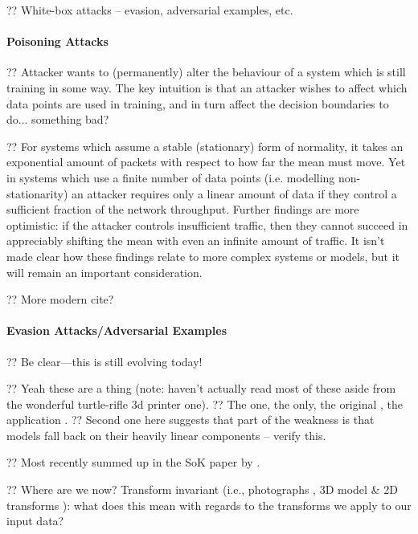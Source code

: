 ?? White-box attacks -- evasion, adversarial examples, etc.

\paragraph{Poisoning Attacks}
?? Attacker wants to (permanently) alter the behaviour of a system which is still training in some way.
The key intuition is that an attacker wishes to affect which data points are used in training, and in turn affect the decision boundaries to do... something bad?

?? For systems which assume a stable (stationary) form of normality, it takes an exponential amount of packets with respect to how far the mean must move.
Yet in systems which use a finite number of data points (i.e. modelling non-stationarity) an attacker requires only a linear amount of data if they control a sufficient fraction of the network throughput.
Further findings are more optimistic: if the attacker controls insufficient traffic, then they cannot succeed in appreciably shifting the mean with even an infinite amount of traffic.
It isn't made clear how these findings relate to more complex systems or models, but it will remain an important consideration. \cite{DBLP:journals/jmlr/KloftL10}

?? More modern cite?

\paragraph{Evasion Attacks/Adversarial Examples}

?? Be clear---this is still evolving today!

?? Yeah these are a thing (note: haven't actually read most of these aside from the wonderful turtle-rifle 3d printer one).
?? The one, the only, the original \parencite{DBLP:journals/corr/SzegedyZSBEGF13}, the application \parencite{DBLP:journals/corr/GoodfellowSS14}.
?? Second one here suggests that part of the weakness is that models fall back on their heavily linear components -- verify this.

?? Most recently summed up in the SoK paper by \textcite{DBLP:conf/eurosp/PapernotMSW18}.

?? Where are we now? Transform invariant (i.e., photographs \cite{DBLP:journals/corr/KurakinGB16}, 3D model \& 2D transforms \cite{DBLP:journals/corr/AthalyeS17}): what does this mean with regards to the transforms we apply to our input data?

